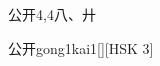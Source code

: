 \begin{entry}{公开}{4,4}{⼋、⼶}
  \begin{phonetics}{公开}{gong1kai1}[][HSK 3]
  \end{phonetics}
\end{entry}

